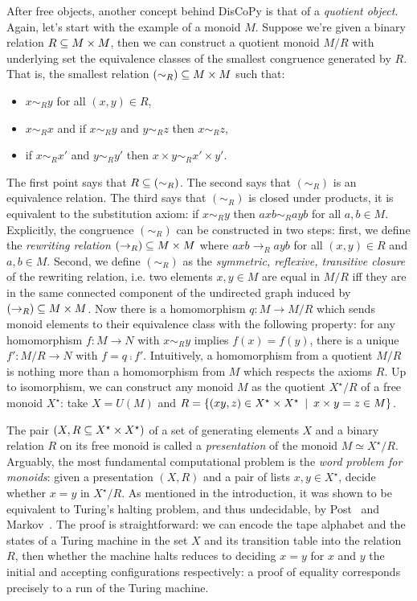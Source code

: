 After free objects, another concept behind DisCoPy is that of a \emph{quotient object}.
Again, let's start with the example of a monoid $M$.
Suppose we're given a binary relation $R \subseteq M \times M$, then we can construct a quotient monoid $M / R$ with underlying set the equivalence classes of the smallest congruence generated by $R$.
That is, the smallest relation $(\sim_R) \subseteq M \times M$ such that:
\begin{itemize}
\item $x \sim_R y$ for all $(x, y) \in R$,
\item $x \sim_R x$ and if $x \sim_R y$ and $y \sim_R z$ then $x \sim_R z$,
\item if $x \sim_R x'$ and $y \sim_R y'$ then $x \times y \sim_R x' \times y'$.
\end{itemize}
The first point says that $R \subseteq (\sim_R)$.
The second says that $(\sim_R)$ is an equivalence relation.
The third says that $(\sim_R)$ is closed under products, it is equivalent to the substitution axiom: if $x \sim_R y$ then $a x b \sim_R a y b$ for all $a, b \in M$.
Explicitly, the congruence $(\sim_R)$ can be constructed in two steps: first, we define the \emph{rewriting relation} $(\to_R) \subseteq M \times M$ where $a x b \to_R a y b$ for all $(x, y) \in R$ and $a, b \in M$.
Second, we define $(\sim_R)$ as the \emph{symmetric, reflexive, transitive closure} of the rewriting relation, i.e. two elements $x, y \in M$ are equal in $M / R$ iff they are in the same connected component of the undirected graph induced by $(\to_R) \subseteq M \times M$.
Now there is a homomorphism $q : M \to M / R$ which sends monoid elements to their equivalence class with the following property: for any homomorphism $f : M \to N$ with $x \sim_R y$ implies $f(x) = f(y)$, there is a unique $f' : M / R \to N$ with $f = q \fcmp f'$.
Intuitively, a homomorphism from a quotient $M / R$ is nothing more than a homomorphism from $M$ which respects the axioms $R$.
Up to isomorphism, we can construct any monoid $M$ as the quotient $X^\star / R$ of a free monoid $X^\star$: take $X = U(M)$ and $R = \{ (x y, z) \in X^\star \times X^\star \enspace \vert \enspace x \times y = z \in M \}$.

The pair $(X, R \subseteq X^\star \times X^\star)$ of a set of generating elements $X$ and a binary relation $R$ on its free monoid is called a \emph{presentation} of the monoid $M \simeq X^\star / R$.
Arguably, the most fundamental computational problem is the \emph{word problem for monoids}: given a presentation $(X, R)$ and a pair of lists $x, y \in X^\star$, decide whether $x = y$ in $X^\star / R$.
As mentioned in the introduction, it was shown to be equivalent to Turing's halting problem, and thus undecidable, by Post~\cite{Post47} and Markov~\cite{Markov47}.
The proof is straightforward: we can encode the tape alphabet and the states of a Turing machine in the set $X$ and its transition table into the relation $R$, then whether the machine halts reduces to deciding $x = y$ for $x$ and $y$ the initial and accepting configurations respectively: a proof of equality corresponds precisely to a run of the Turing machine.

